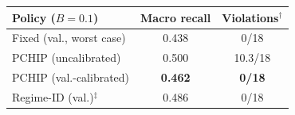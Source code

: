 \begin{tabular}{lcc}
\toprule
Policy ($B=0.1$) & Macro recall & Violations$^{\dagger}$ \\
\midrule
Fixed (val., worst case) & 0.438 & 0/18 \\
PCHIP (uncalibrated) & 0.500 & 10.3/18 \\
PCHIP (val.-calibrated) & \textbf{0.462} & \textbf{0/18} \\
Regime-ID (val.)$^{\ddagger}$ & 0.486 & 0/18 \\
\bottomrule
\end{tabular}
